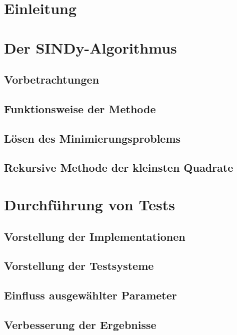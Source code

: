 \documentclass[arbeit=studie,oneside,BCOR=12mm]{ArbeitRST}
\begin{document}
%




\chapter{Einleitung}


\chapter{Der SINDy-Algorithmus}
\label{cha:sindy}
\section{Vorbetrachtungen} 

\section{Funktionsweise der Methode}

\section{Lösen des Minimierungsproblems}

\section{Rekursive Methode der kleinsten Quadrate}
\label{sec:rMKQ}


\chapter{Durchführung von Tests}
\section{Vorstellung der Implementationen}

\section{Vorstellung der Testsysteme}

\section{Einfluss ausgewählter Parameter}

\section{Verbesserung der Ergebnisse}

\end{document}
